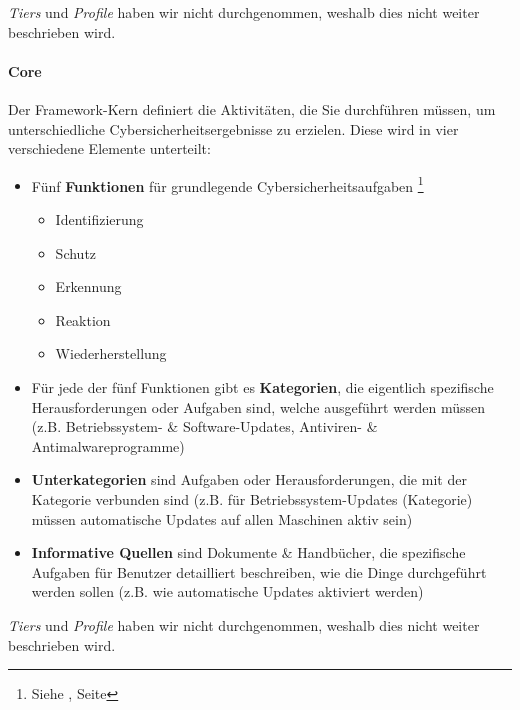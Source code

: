 \documentclass[10pt,a4paper]{article}
\begin{document}
\noindent
\textsl{Tiers} und \textsl{Profile} haben wir nicht durchgenommen, weshalb dies nicht weiter beschrieben wird.

\paragraph*{Core}\label{para:NISTcore}Der Framework-Kern definiert die Aktivitäten, die Sie durchführen müssen, um unterschiedliche Cybersicherheitsergebnisse zu erzielen. Diese wird in vier verschiedene Elemente unterteilt:
\begin{itemize}[noitemsep,topsep=0pt,leftmargin=*]
    \item Fünf \textbf{Funktionen} für grundlegende Cybersicherheitsaufgaben \footnote{{Siehe \underline{}, Seite \pageref{nistfunctions}}}
    \begin{itemize}[noitemsep,topsep=0pt,leftmargin=*]
        \item Identifizierung
        \item Schutz
        \item Erkennung
        \item Reaktion
        \item Wiederherstellung
    \end{itemize}
    \item Für jede der fünf Funktionen gibt es \textbf{Kategorien}, die eigentlich spezifische Herausforderungen oder Aufgaben sind, welche ausgeführt werden müssen (z.B. Betriebssystem- \& Software-Updates, Antiviren- \& Antimalwareprogramme)
    \item \textbf{Unterkategorien} sind Aufgaben oder Herausforderungen, die mit der Kategorie verbunden sind (z.B. für Betriebssystem-Updates (Kategorie) müssen automatische Updates auf allen Maschinen aktiv sein)
    \item \textbf{Informative Quellen } sind Dokumente \& Handbücher, die spezifische Aufgaben für Benutzer detailliert beschreiben, wie die Dinge durchgeführt werden sollen (z.B. wie automatische Updates aktiviert werden)
\end{itemize}
\textsl{Tiers} und \textsl{Profile} haben wir nicht durchgenommen, weshalb dies nicht weiter beschrieben wird.
\end{document}
